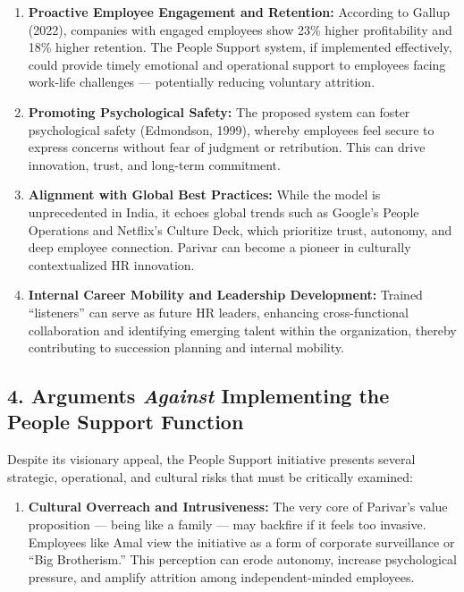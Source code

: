 \documentclass[10pt,a4paper]{book}
\begin{document}
\begin{multicols}{2}
\begin{enumerate}
    \item \textbf{Proactive Employee Engagement and Retention:} According to Gallup (2022), companies with engaged employees show 23\% higher profitability and 18\% higher retention. The People Support system, if implemented effectively, could provide timely emotional and operational support to employees facing work-life challenges — potentially reducing voluntary attrition.

    \item \textbf{Promoting Psychological Safety:} The proposed system can foster psychological safety (Edmondson, 1999), whereby employees feel secure to express concerns without fear of judgment or retribution. This can drive innovation, trust, and long-term commitment.

    \item \textbf{Alignment with Global Best Practices:} While the model is unprecedented in India, it echoes global trends such as Google’s People Operations and Netflix’s Culture Deck, which prioritize trust, autonomy, and deep employee connection. Parivar can become a pioneer in culturally contextualized HR innovation.

    \item \textbf{Internal Career Mobility and Leadership Development:} Trained “listeners” can serve as future HR leaders, enhancing cross-functional collaboration and identifying emerging talent within the organization, thereby contributing to succession planning and internal mobility.

\end{enumerate}

\subsection*{4. Arguments \textit{Against} Implementing the People Support Function}

Despite its visionary appeal, the People Support initiative presents several strategic, operational, and cultural risks that must be critically examined:

\begin{enumerate}
    \item \textbf{Cultural Overreach and Intrusiveness:} The very core of Parivar’s value proposition — being like a family — may backfire if it feels too invasive. Employees like Amal view the initiative as a form of corporate surveillance or “Big Brotherism.” This perception can erode autonomy, increase psychological pressure, and amplify attrition among independent-minded employees.


\end{enumerate}
\end{multicols}
\end{document}
